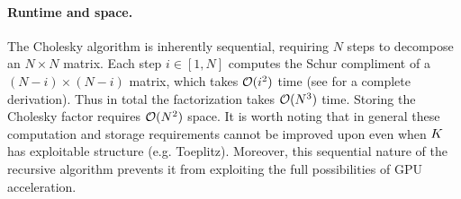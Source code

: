 \paragraph{Runtime and space.}
The Cholesky algorithm is inherently sequential, requiring $N$ steps to decompose an $N \times N$ matrix.
Each step $i \in [1, N]$ computes the Schur compliment of a $(N-i) \times (N-i)$ matrix, which takes $\bigo{i^2}$ time (see \citep[][Sec. 4.2]{golub2012matrix} for a complete derivation).
Thus in total the factorization takes $\bigo{N^3}$ time.
Storing the Cholesky factor requires $\bigo{N^2}$ space.
It is worth noting that in general these computation and storage requirements cannot be improved upon even when $K$ has exploitable structure (e.g. Toeplitz).
Moreover, this sequential nature of the recursive algorithm prevents it from exploiting the full possibilities of GPU acceleration.



